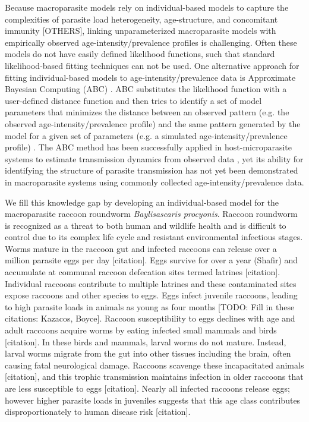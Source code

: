 \documentclass[11pt]{article}
\begin{document}
Because macroparasite models rely on individual-based models to capture the complexities of parasite load heterogeneity, age-structure, and concomitant immunity \citep[e.g.][]{Cornell2005,Drawert2017,McCallum2017} [OTHERS], linking unparameterized macroparasite models with empirically observed age-intensity/prevalence profiles is challenging.  Often these models do not have easily defined likelihood functions, such that standard likelihood-based fitting techniques can not be used. One alternative approach for fitting individual-based models to age-intensity/prevalence data is Approximate Bayesian Computing (ABC) \citep{Beaumont2010}. ABC substitutes the likelihood function with a user-defined distance function and then tries to identify a set of model parameters that minimizes the distance between an observed pattern (e.g. the observed age-intensity/prevalence profile) and the same pattern generated by the model for a given set of parameters (e.g. a simulated age-intensity/prevalence profile) \citep{Toni2009,Beaumont2010}.  The ABC method has been successfully applied in host-microparasite systems to estimate transmission dynamics from observed data \citep{Conlan2012,Kosmala2015}, yet its ability for identifying the structure of parasite transmission has not yet been demonstrated in macroparasite systems using commonly collected age-intensity/prevalence data. 

We fill this knowledge gap by developing an individual-based model for the macroparasite raccoon roundworm \emph{Baylisascaris procyonis}. Raccoon roundworm is recognized as a threat to both human and wildlife health \citep{Page2011,Weinstein2017} and is difficult to control due to its complex life cycle
and resistant environmental infectious stages. Worms mature in the
raccoon gut and infected raccoons can release over a million parasite
eggs per day [citation]. Eggs survive for over a year (Shafir) and accumulate at
communal raccoon defecation sites termed latrines [citation]. Individual
raccoons contribute to multiple latrines and these contaminated sites
expose raccoons and other species to eggs. Eggs infect juvenile
raccoons, leading to high parasite loads in animals as young as four
months \citep{Weinstein2016} [TODO: Fill in these citations: Kazacos, Boyce]. Raccoon susceptibility to eggs
declines with age and adult raccoons acquire worms by eating infected
small mammals and birds [citation]. In these birds and mammals, larval worms do
not mature. Instead, larval worms migrate from the gut into other
tissues including the brain, often causing fatal neurological damage.
Raccoons scavenge these incapacitated animals [citation], and this trophic
transmission maintains infection in older raccoons that are less
susceptible to eggs [citation]. Nearly all infected raccoons release eggs;
however higher parasite loads in juveniles suggests that this age class
contributes disproportionately to human disease risk [citation].
\end{document}
